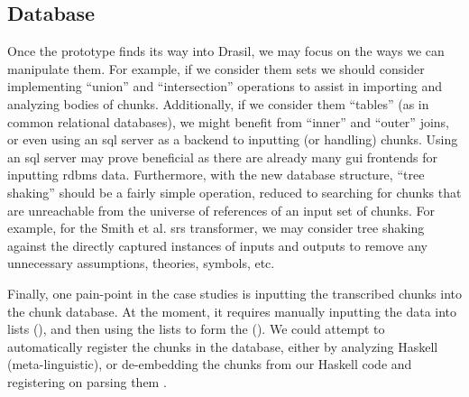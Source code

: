 \subsection{Database}
\label{chap:futureWork:sec:chunks:sub:database}

Once the \ChunkDB{} prototype finds its way into Drasil, we may focus on the
ways we can manipulate them. For example, if we consider them sets we should
consider implementing ``union'' and ``intersection'' operations to assist in
importing and analyzing bodies of chunks. Additionally, if we consider them
``tables'' (as in common relational databases), we might benefit from ``inner''
and ``outer'' joins, or even using an \acs{sql} server as a backend to inputting
(or handling) chunks. Using an \acs{sql} server may prove beneficial as there
are already many \acs{gui} frontends for inputting \acs{rdbms} data.
Furthermore, with the new database structure, ``tree shaking'' should be a
fairly simple operation, reduced to searching for chunks that are unreachable
from the universe of references of an input set of chunks. For example, for the
Smith et al. \acs{srs} transformer, we may consider tree shaking against the
directly captured instances of inputs and outputs to remove any unnecessary
assumptions, theories, symbols, etc.

Finally, one pain-point in the case studies is inputting the transcribed chunks
into the chunk database. At the moment, it requires manually inputting the data
into lists (), and then using the
lists to form the \ChunkDB{}
(). We could attempt to
automatically register the chunks in the database, either by analyzing Haskell
(meta-linguistic), or de-embedding the chunks from our Haskell code and
registering on parsing them \cite{DrasilIssue2873ChunkDBCaretteResponse}. 
